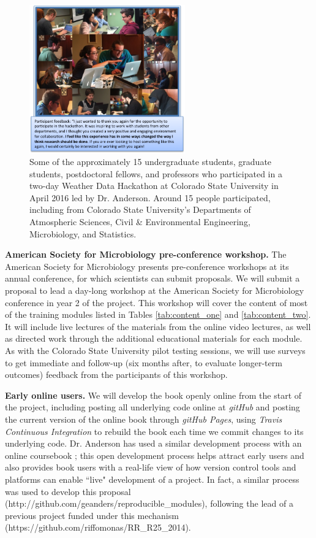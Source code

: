 \documentclass[pdftex,english,11.5pt,parskip=half]{scrartcl}
\begin{document}
\begin{figure} \centering \includegraphics[width =
0.6\textwidth]{figures/csu_hackathon.png} \caption{Some of the approximately 15
undergraduate students, graduate students, postdoctoral fellows, and professors
who participated in a two-day Weather Data Hackathon at Colorado State
University in April 2016 led by Dr. Anderson. Around 15 people participated, including from Colorado State University's Departments of
Atmospheric Sciences, Civil \& Environmental Engineering, Microbiology, and
Statistics. } \label{csu-r-hackathon}
\end{figure}

\textbf{American Society for Microbiology pre-conference workshop.}
The American Society for Microbiology presents pre-conference workshops at its annual 
conference, for which scientists can submit proposals. We will submit a proposal 
to lead a day-long workshop at the American Society for Microbiology conference in year 2 of the project. This 
workshop will cover the content of most of the training modules listed in Tables
\ref*{tab:content_one} and \ref*{tab:content_two}. It will include live lectures of the 
materials from the online video lectures, as well as directed work through the 
additional educational materials for each module. As with the Colorado State University pilot testing sessions, we will use surveys to get immediate and follow-up (six months after, to evaluate longer-term outcomes) feedback from 
the participants of this workshop.

\textbf{Early online users.}  We will develop the book openly online from the start of 
the project, including posting all underlying code online at \textit{gitHub} and 
posting the current version of the online book through \textit{gitHub Pages}, using 
\textit{Travis Continuous Integration} to rebuild the book each time we commit 
changes to its underlying code. Dr. Anderson has used a similar development process
with an online coursebook \cite{andersoncoursebook}; this open development process
helps attract early users and also provides book users with a real-life view of how 
version control tools and platforms can enable ``live" development of a project. In fact, a similar process was used to develop this proposal (http://github.com/geanders/reproducible\_modules), following the lead of a previous project funded under this mechanism (https://github.com/riffomonas/RR\_R25\_2014).
\end{document}
